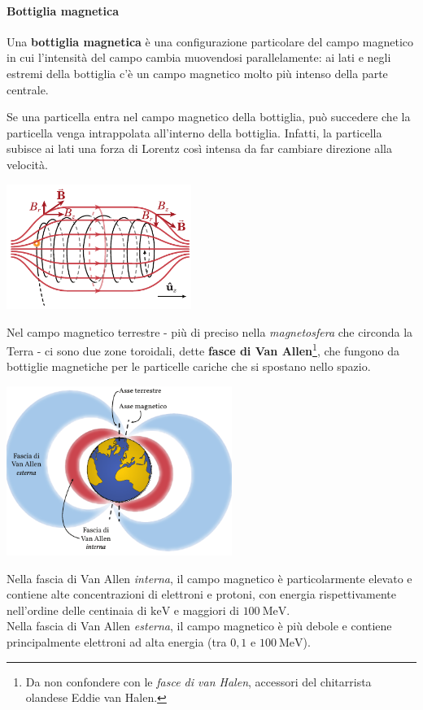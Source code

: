 \paragraph{Bottiglia magnetica}
\begin{define}
	Una \textbf{bottiglia magnetica} è una configurazione particolare del campo magnetico in cui l'intensità del campo cambia muovendosi parallelamente: ai lati e negli estremi della bottiglia c'è un campo magnetico molto più intenso della parte centrale.
\end{define}
Se una particella entra nel campo magnetico della bottiglia, può succedere che la particella venga intrappolata all'interno della bottiglia. Infatti, la particella subisce ai lati una forza di Lorentz così intensa da far cambiare direzione alla velocità.
\begin{center}
	\includegraphics[width=0.45\textwidth]{images/chp7/chp7bottigliamagnetica1.pdf}
\end{center}
\begin{example}
	Nel campo magnetico terrestre - più di preciso nella \textit{magnetosfera} che circonda la Terra - ci sono due zone toroidali, dette \textbf{fasce di Van Allen}\footnote{Da non confondere con le \textit{fasce di van Halen}, accessori del chitarrista olandese Eddie van Halen.}, che fungono da bottiglie magnetiche per le particelle cariche che si spostano nello spazio.
	\begin{center}
		\includegraphics[width=0.55\textwidth]{images/chp7/chp7vanallen.pdf}
	\end{center}
	Nella fascia di Van Allen \textit{interna}, il campo magnetico è particolarmente elevato e contiene alte concentrazioni di elettroni e protoni, con energia rispettivamente nell'ordine delle centinaia di $\unit{\kilo\electronvolt}$ e maggiori di $\SI{100}{\mega\electronvolt}$.\\
	Nella fascia di Van Allen \textit{esterna}, il campo magnetico è più debole e contiene principalmente elettroni ad alta energia (tra $0,1$ e $\SI{100}{\mega\electronvolt}$).%
\end{example}
